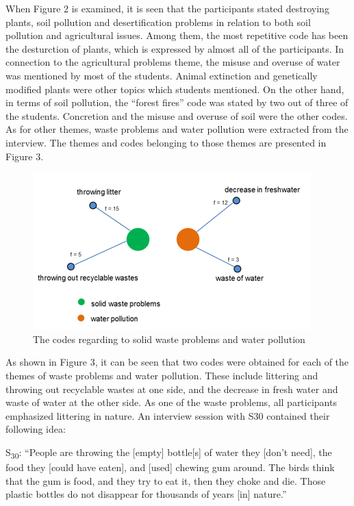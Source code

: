 \documentclass[11.5pt]{sig-alternate} %
\begin{document}
\begin{large}
When Figure 2 is examined, it is seen that the participants stated destroying plants, soil pollution and desertification problems in relation to both soil pollution and agricultural issues. Among them, the most repetitive code has been the desturction of plants, which is expressed by almost all of the participants. In connection to the agricultural problems theme, the misuse and overuse of water was mentioned by most of the students. Animal extinction and genetically modified plants were other topics which students mentioned.  On the other hand, in terms of soil pollution, the “forest fires” code was stated by two out of three of the students. Concretion and the misuse and overuse of soil were the other codes. As for other themes, waste problems and water pollution were extracted from the interview. The themes and codes belonging to those themes are presented in Figure 3.

\begin{figure}[tp]
    \centering
    \includegraphics[width=1\linewidth]{Fig3.png}
    \caption{The codes regarding to solid waste problems and water pollution}
\end{figure}

As shown in Figure 3, it can be seen that two codes were obtained for each of the themes of waste problems and water pollution. These include littering and throwing out recyclable wastes at one side, and the decrease in fresh water and waste of water at the other side. As one of the waste problems, all participants emphasized littering in nature. An interview session with S30 contained their following idea:

S\textsubscript{30}: “People are throwing the [empty] bottle[s] of water they [don’t need], the food they [could have eaten], and [used] chewing gum around. The birds think that the gum is food, and they try to eat it, then they choke and die. Those plastic bottles do not disappear for thousands of years [in] nature.” 


\end{large}
\end{document}
